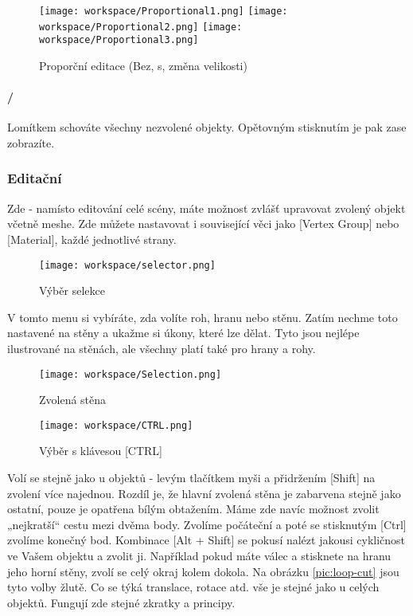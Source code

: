 \documentclass[12pt,a4paper]{report}
\begin{document}
	\begin{figure}[h]
		\centering
		\texttt{[image: workspace/Proportional1.png]}
		\texttt{[image: workspace/Proportional2.png]}
		\texttt{[image: workspace/Proportional3.png]}
		\caption{Proporční editace (Bez, s, změna velikosti)}
		\label{pic:proportional1-3}
	\end{figure}

	\paragraph{/} Lomítkem schováte všechny nezvolené objekty. Opětovným
stisknutím je pak zase zobrazíte.
	
	\subsubsection{Editační}
	Zde - namísto editování celé scény, máte možnost zvlášť upravovat
	zvolený objekt včetně meshe. Zde můžete nastavovat i související věci
	jako [Vertex Group] nebo [Material], každé jednotlivé strany. \\
	
	\begin{figure}[h]
		\centering
		\texttt{[image: workspace/selector.png]}
		\caption{Výběr selekce}
		\label{pic:selector}
	\end{figure}

	V tomto menu si vybíráte, zda volíte roh, hranu nebo stěnu. Zatím
	nechme toto nastavené na stěny a ukažme si úkony, které lze dělat. Tyto
	jsou nejlépe ilustrované na stěnách, ale všechny platí také pro hrany
	a rohy.
	
	\begin{figure}[h]
		\centering
		\texttt{[image: workspace/Selection.png]}
		\caption{Zvolená stěna}
		\label{pic:selection}
	\end{figure}
	\begin{figure}[h]
		\centering
		\texttt{[image: workspace/CTRL.png]}
		\caption{Výběr s klávesou [CTRL]}
		\label{pic:selection-ctrl}
	\end{figure}

	Volí se stejně jako u objektů - levým tlačítkem myši a přidržením [Shift]
	na zvolení více najednou. Rozdíl je, že hlavní zvolená stěna je zabarvena
	stejně jako ostatní, pouze je opatřena bílým obtažením.
	Máme zde navíc možnost zvolit „nejkratší“ cestu mezi dvěma body.
	Zvolíme počáteční a poté se stisknutým [Ctrl] zvolíme konečný bod.
	Kombinace [Alt + Shift] se pokusí nalézt jakousi cykličnost ve Vašem
	objektu a zvolit ji. Například pokud máte válec a stisknete na hranu jeho
	horní stěny, zvolí se celý okraj kolem dokola. Na obrázku \ref{pic:loop-cut} jsou tyto
	volby žlutě.
	Co se týká translace, rotace atd. vše je stejné jako u celých objektů.
	Fungují zde stejné zkratky a principy.
	
\end{document}
